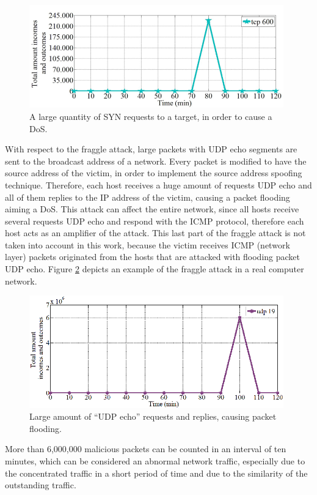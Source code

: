 \begin{figure}[h!]
     \centering 
     \includegraphics[width=11cm]{figures/fig05.png}
     \caption{A large quantity of SYN requests to a target, in order to cause a DoS.}
     \label{fig:2_fig5}
\end{figure}

With respect to the fraggle attack, large packets with UDP echo segments are sent to the broadcast address of a network. Every packet is modified to have the source address of the victim, in order to implement the source address spoofing technique. Therefore, each host receives a huge amount of requests UDP echo and all of them replies to the IP address of the victim, causing a packet flooding aiming a DoS. This attack can affect the entire network, since all hosts receive several requests UDP echo and respond with the ICMP protocol, therefore each host acts as an amplifier of the attack. This last part of the fraggle attack is not taken into account in this work, because the victim receives ICMP (network layer) packets originated from the hosts that are attacked with flooding packet UDP echo. Figure \ref{fig:2_fig6} depicts an example of the fraggle attack in a real computer network. 

\begin{figure}[h!]
     \centering 
     \includegraphics[width=11cm]{figures/fig06.png}
     \caption{Large amount of “UDP echo” requests and replies, causing packet flooding.}
     \label{fig:2_fig6}
\end{figure}

More than 6,000,000 malicious packets can be counted in an interval of ten minutes, which can be considered an abnormal network traffic, especially due to the concentrated traffic in a short period of time and due to the similarity of the outstanding traffic.

